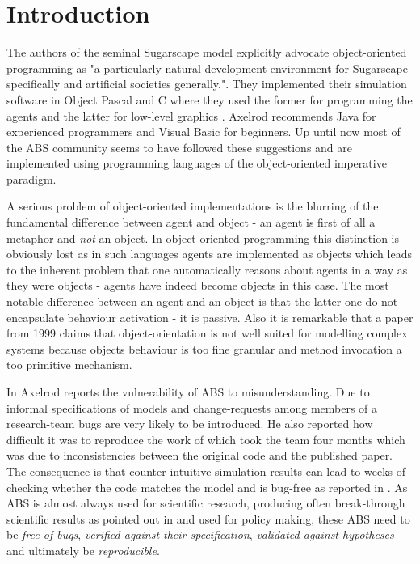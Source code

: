 \section{Introduction}


The authors of the seminal Sugarscape model \cite{epstein_growing_1996} explicitly advocate object-oriented programming as "a particularly natural development environment for Sugarscape specifically and artificial societies generally.". They implemented their simulation software in Object Pascal and C where they used the former for programming the agents and the latter for low-level graphics \cite{axtell_aligning_1996}. Axelrod \cite{axelrod_advancing_1997} recommends Java for experienced programmers and Visual Basic for beginners. Up until now most of the ABS community seems to have followed these suggestions and are implemented using programming languages of the object-oriented imperative paradigm.

A serious problem of object-oriented implementations is the blurring of the fundamental difference between agent and object - an agent is first of all a metaphor and \textit{not} an object. In object-oriented programming this distinction is obviously lost as in such languages agents are implemented as objects which leads to the inherent problem that one automatically reasons about agents in a way as they were objects - agents have indeed become objects in this case. The most notable difference between an agent and an object is that the latter one do not encapsulate behaviour activation \cite{jennings_agent-based_2000} - it is passive. Also it is remarkable that \cite{jennings_agent-based_2000} a paper from 1999 claims that object-orientation is not well suited for modelling complex systems because objects behaviour is too fine granular and method invocation a too primitive mechanism.

In \cite{axelrod_chapter_2006} Axelrod reports the vulnerability of ABS to misunderstanding. Due to informal specifications of models and change-requests among members of a research-team bugs are very likely to be introduced. He also reported how difficult it was to reproduce the work of \cite{axelrod_convergence_1995} which took the team four months which was due to inconsistencies between the original code and the published paper. The consequence is that counter-intuitive simulation results can lead to weeks of checking whether the code matches the model and is bug-free as reported in \cite{axelrod_advancing_1997}. As ABS is almost always used for scientific research, producing often break-through scientific results as pointed out in \cite{axelrod_chapter_2006} and used for policy making, these ABS need to be \textit{free of bugs}, \textit{verified against their specification}, \textit{validated against hypotheses} and ultimately be \textit{reproducible}.


